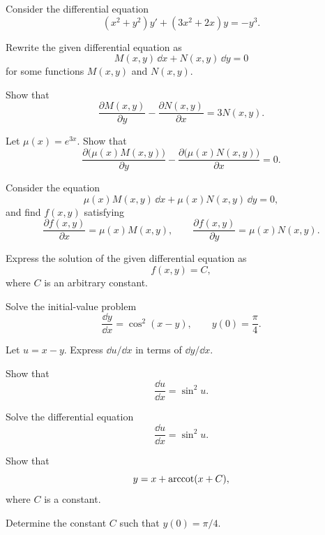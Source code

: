 \documentclass[11pt,oneside]{article}
\begin{document}
\begin{problem}
Consider the differential equation
\[
(x^2+y^2)y'+(3x^2+2x)y=-y^3.
\]
\begin{problemsubparts}
\item Rewrite the given differential equation as
\[
M(x,y)\,\dd x+N(x,y)\,\dd y=0
\]
for some functions $M(x,y)$ and $N(x,y)$.
\item Show that
\[
\frac{\partial M(x,y)}{\partial y}
-\frac{\partial N(x,y)}{\partial x}
=3N(x,y).
\]
\item Let $\mu(x)=e^{3x}$. Show that
\[
\frac{\partial\bigl(\mu(x)M(x,y)\bigr)}{\partial y}
-\frac{\partial\bigl(\mu(x)N(x,y)\bigr)}{\partial x}
=0.
\]
\item Consider the equation
\[
\mu(x)M(x,y)\,\dd x+\mu(x)N(x,y)\,\dd y=0,
\]
and find $f(x,y)$ satisfying
\[
\frac{\partial f(x,y)}{\partial x}=\mu(x)M(x,y),
\qquad
\frac{\partial f(x,y)}{\partial y}=\mu(x)N(x,y).
\]
\item Express the solution of the given differential equation as
\[
f(x,y)=C,
\]
where $C$ is an arbitrary constant.
\end{problemsubparts}
\end{problem}

\begin{problem}
Solve the initial-value problem
\[
\frac{\dd y}{\dd x}=\cos^2(x-y),
\qquad
y(0)=\frac{\pi}{4}.
\]
\begin{problemsubparts}
\item Let $u=x-y$. Express $\dd u/\dd x$ in terms of $\dd y/\dd x$.
\item Show that
\[
\frac{\dd u}{\dd x}=\sin^2u.
\]
\item Solve the differential equation
\[
\frac{\dd u}{\dd x}=\sin^2u.
\]
\item Show that
\[
y=x+\operatorname{arccot}(x+C),
\]
where $C$ is a constant.
\item Determine the constant $C$ such that $y(0)=\pi/4$.
\end{problemsubparts}
\end{problem}
\end{document}
